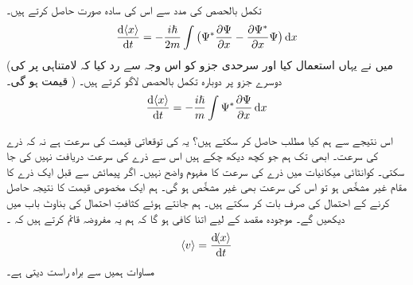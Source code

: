 تکمل بالحصص کی مدد سے اس  کی سادہ صورت حاصل کرتے ہیں۔
\begin{align}
\frac{\dif\, \langle x \rangle}{\dif{t}}=-\frac{i\hslash}{2m}\int\big (\Psi^*\frac{\partial{\Psi}}{\partial{x}}-\frac{\partial{\Psi^*}}{\partial{x}}\Psi \big)\dif{x}
\end{align}
(میں نے یہاں  استعمال کیا اور سرحدی جزو کو اس وجہ سے رد کیا کہ  لامتناہی     پر  کی قیمت  ہو گی۔ ) دوسرے جزو پر دوبارہ تکمل بالحصص لاگو کرتے ہیں۔
\begin{align}\label{مساوات_تفاعل_موج_توقعاتی_قیمت_رفتار}
\frac{\dif \,\langle x \rangle}{\dif{t}}=-\frac{i\hslash}{m}\int\Psi^*\frac{\partial{\Psi}}{\partial{x}} \dif{x}
\end{align}

اس نتیجے سے ہم کیا مطلب حاصل کر سکتے ہیں؟ یہ  کی توقعاتی قیمت کی سرعت ہے نہ کہ ذرے کی سرعت۔ ابھی تک ہم جو کچھ دیکھ چکے ہیں اس سے ذرے کی  سرعت دریافت نہیں کی جا سکتی۔ کوانٹائی میکانیات میں ذرے کی سرعت کا مفہوم واضح نہیں۔ اگر پیمائش سے قبل ایک ذرے کا مقام غیر مشخَّص ہو تو اس کی سرعت بھی غیر مشخَّص ہو گی۔ ہم ایک مخصوص قیمت کا نتیجہ حاصل کرنے کے احتمال کی صرف بات کر سکتے ہیں۔ ہم  جانتے ہوئے کثافتِ احتمال کی بناوٹ باب  میں دیکھیں گے۔ موجودہ مقصد کے لیے  اتنا کافی ہو گا کہ ہم یہ مفروضہ قائم کرتے ہیں  کہ ۔
\begin{align}\label{مساوات_تفاعل_موج_تعریف_رفتار}
\langle v \rangle=\frac{\dif\langle x \rangle}{\dif{t}}
\end{align}
مساوات  ہمیں  سے براہ راست     دیتی ہے۔ 

